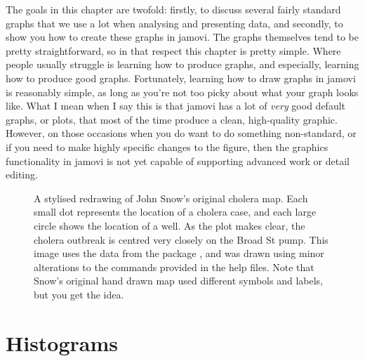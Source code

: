 The goals in this chapter are twofold: firstly, to discuss several fairly standard graphs that we use a lot when analysing and presenting data, and secondly, to show you how to create these graphs in jamovi. The graphs themselves tend to be pretty straightforward, so in that respect this chapter is pretty simple. Where people usually struggle is learning how to produce graphs, and especially, learning how to produce good graphs. Fortunately, learning how to draw graphs in jamovi is reasonably simple, as long as you're not too picky about what your graph looks like. What I mean when I say this is that jamovi has a lot of {\it very} good default graphs, or plots, that most of the time produce a clean, high-quality graphic. However, on those occasions when you do want to do something non-standard, or if you need to make highly specific changes to the figure, then the graphics functionality in jamovi is not yet capable of supporting advanced work or detail editing. 

\begin{figure}[t!!]
\begin{center}
\caption{A stylised redrawing of John Snow's original cholera map. Each small dot represents the location of a cholera case, and each large circle shows the location of a well. As the plot makes clear, the cholera outbreak is centred very closely on the Broad St pump.  This image uses the data from the  package \protect\cite{Friendly2011}, and was drawn using minor alterations to the commands provided in the help files. Note that Snow's original hand drawn map used different symbols and labels, but you get the idea.}
\label{fig:snowmap1}
\HR
\end{center}
\end{figure}


\section{Histograms\label{sec:hist}}
 
